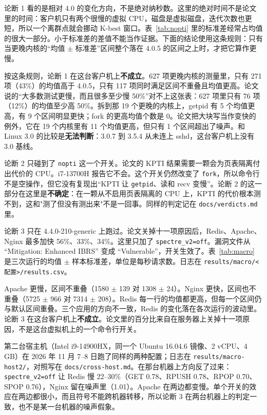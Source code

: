 \documentclass[11pt,fontset=none]{ctexart}
\begin{document}
论断 1 看的是相对 4.0 的变化方向，不是绝对纳秒数。这里的绝对时间不是论文里的时间：客户机只有两个很慢的虚拟 CPU，磁盘是虚拟磁盘，迭代次数也更短，所以一个离群点就会挪动 K-best 窗口。表~\ref{tab:nopti} 里的标准差经常占均值的很大一部分。小于标准差的差值不能当作证据。下面的结论使用这条规则：只有当更晚内核的“均值 $\pm$ 标准差”区间整个落在 4.0.5 的区间之上时，才把它算作更慢。

按这条规则，论断 1 在这台客户机上\textbf{不成立}。627 项更晚内核的测量里，只有 271 项（43\%）的均值高于 4.0.5，只有 117 项同时满足区间不重叠且均值更高。论文说的“大多数测试更慢，而且很多至少慢 50\%”对不上这张表：627 项里只有 76 项（12\%）的均值至少高 50\%。拆到那 19 个更晚的内核上，getpid 有 5 个均值更高，有 9 个区间明显更快；fork 的更高均值个数是 0。论文把大块写当作变快的例外，它在 19 个内核里有 11 个均值更高，但只有 1 个区间超出了噪声。和 Linux 3.0 的比较是\textbf{无法判断}：3.0.7 到 3.5.4 从未连上 sshd，这台客户机上没有 3.0 基线。

论断 2 只碰到了 \texttt{nopti} 这一个开关。论文的 KPTI 结果需要一颗会为页表隔离付出代价的 CPU。i7-13700H 报告它不会。这个开关仍然改变了 \texttt{fork}，所以命令行不是空操作，但它没有复现出“KPTI 让 \texttt{getpid}、读和 recv 变慢”。论断 2 的这一部分在这里是\textbf{不确定}：在一颗从不启用页表隔离的 CPU 上，KPTI 的代价根本测不到，这和"测了但没有测出来"不是一回事。同样的判定记在 \texttt{docs/verdicts.md} 里。

论断 3 只在 4.4.0-210-generic 上跑过。论文关掉十一项原因后，Redis、Apache、Nginx 最多加快 56\%、33\%、34\%。这里只加了 \texttt{spectre\_v2=off}。漏洞文件从 “Mitigation: Enhanced IBRS” 变成 “Vulnerable”，开关生效了。表~\ref{tab:macro} 是三次运行的均值 $\pm$ 样本标准差，单位是每秒请求数。日志在 \texttt{results/macro/<配置>/results.csv}。

\begin{table}[ht]
\centering
\caption{同一内核上的应用吞吐。比值是 \texttt{spectre\_v2=off} 的均值除以默认均值。}
\label{tab:macro}

\end{table}

Apache 更慢，区间不重叠（1580 $\pm$ 139 对 1308 $\pm$ 24）。Nginx 更快，区间也不重叠（5725 $\pm$ 966 对 7314 $\pm$ 208）。Redis 每一行的均值都更高，但每一个区间仍与默认区间重叠。三个应用的方向不一致，Redis 的变化落在各次运行的波动里。论断 3 在这台客户机上\textbf{不成立}。论文里的百分比来自在服务器上关掉十一项原因，不是这台虚拟机上的一个命令行开关。

第二台宿主机（Intel i9-14900HX，同一个 Ubuntu 16.04.6 镜像、2 vCPU、4\,GB）在 2026 年 11 月 7--8 日跑了同样的两种配置；日志在 \texttt{results/macro-host2/}，对照写在 \texttt{docs/cross-host.md}。在那台机器上方向反了过来：\texttt{spectre\_v2=off} 让 Redis 慢 22--30\%（GET 0.78、RPUSH 0.78、RPOP 0.70、SPOP 0.76），Nginx 留在噪声里（1.01）。Apache 在两边都变慢。单个开关的效应在两边都很小，而且符号不能跨机器转移，所以论断 3 在两台机器上的判定一致，也不是某一台机器的噪声假象。
\end{document}
